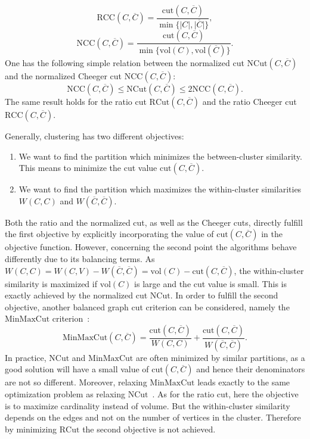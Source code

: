 \begin{equation}
  \displaystyle \mathrm{RCC}(C,\overline{C}) =  \frac{\mathrm{cut}(C,\overline{C})}{\min{\{\lvert C \rvert,\lvert \overline{C} \rvert\}} }, 
\end{equation}
\begin{equation}
  \displaystyle \mathrm{NCC}(C,\overline{C}) =  \frac{\mathrm{cut}(C,\overline{C})}{\min{\{\mathrm{vol}(C),\mathrm{vol}(\overline{C})\}} }. 
\end{equation}
One has the following simple relation between the normalized cut $\mathrm{NCut}(C,\overline{C})$ and the normalized Cheeger cut $\mathrm{NCC}(C,\overline{C})$:
\begin{equation*}
 \mathrm{NCC}(C,\overline{C})\leq \mathrm{NCut}(C,\overline{C})\leq \mathrm{2NCC}(C,\overline{C}).
\end{equation*}
The same result holds for the ratio cut $\mathrm{RCut}(C,\overline{C})$ and the ratio Cheeger cut $\mathrm{RCC}(C,\overline{C})$.

Generally, clustering has two different objectives:
\begin{enumerate}
\item We want to find the partition which minimizes the between-cluster similarity. This means to minimize the cut value $\mathrm{cut}(C,\overline{C})$.
\item We want to find the partition which maximizes the within-cluster similarities $W(C,C)$ and $W(\overline{C},\overline{C})$.
\end{enumerate}

Both the ratio and the normalized cut, as well as the Cheeger cuts, directly fulfill the first objective by explicitly incorporating the value of $\mathrm{cut}(C,\overline{C})$ in the objective function. 
However, concerning the second point the algorithms behave differently due to its balancing terms. As $W(C,C)= W(C,V)-W(\overline{C},\overline{C}) = \mathrm{vol}(C)-\mathrm{cut}(C,\overline{C})$, 
the within-cluster similarity is maximized if $\mathrm{vol}(C)$ is large and the cut value is small. This is exactly
achieved by the normalized cut $\mathrm{NCut}$. In order to fulfill the second objective, another balanced graph cut criterion can be considered, namely the $\mathrm{MinMaxCut}$ criterion~\cite{DingHZGS01}:
\begin{equation}
 \mathrm{MinMaxCut}(C,\overline{C}) =  \frac{\mathrm{cut}(C,\overline{C})}{W(C,C)} + \frac{\mathrm{cut}(C,\overline{C})}{W(\overline{C},\overline{C})}.
\end{equation}
In practice, $\mathrm{NCut}$ and $\mathrm{MinMaxCut}$ are often minimized by similar partitions, as a good solution will have a small value of $\mathrm{cut}(C,\overline{C})$ and hence
their denominators are not so different. Moreover, relaxing $\mathrm{MinMaxCut}$ leads exactly to the same optimization problem as relaxing
$\mathrm{NCut}$~\cite{Luxb07}.
As for the ratio cut, here the objective is to maximize cardinality instead of volume. But the within-cluster similarity depends on the edges and not on the number of vertices in the cluster. Therefore by minimizing $\mathrm{RCut}$ the
second objective is not achieved.

